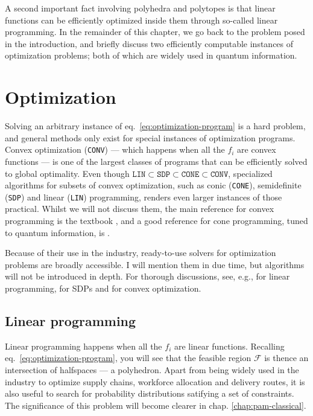 		A second important fact involving polyhedra and polytopes is that linear functions can be efficiently optimized inside them through so-called linear programming. In the remainder of this chapter, we go back to the problem posed in the introduction, and briefly discuss two efficiently computable instances of optimization problems; both of which are widely used in quantum information.


	\section{Optimization}

		Solving an arbitrary instance of eq.~\eqref{eq:optimization-program} is a hard problem, and general methods only exist for special instances of optimization programs. Convex optimization (\texttt{CONV}) --- which happens when all the $f_i$ are convex functions --- is one of the largest classes of programs that can be efficiently solved to global optimality. Even though $\texttt{LIN} \subset \texttt{SDP} \subset \texttt{CONE} \subset \texttt{CONV}$, specialized algorithms for subsets of convex optimization, such as conic (\texttt{CONE}), semidefinite (\texttt{SDP}) and linear (\texttt{LIN}) programming, renders even larger instances of those practical. Whilst we will not discuss them, the main reference for convex programming is the textbook \cite{boyd_convexoptimization_2004}, and a good reference for cone programming, tuned to quantum information, is \cite{uola_conic_2019}.

		Because of their use in the industry, ready-to-use solvers for optimization problems are broadly accessible. I will mention them in due time, but algorithms will not be introduced in depth. For thorough discussions, see, e.g., \cite{papadimitriou1998combinatorial,matousek2007understanding} for linear programming, \cite{vandenberghe_sdp_1996,gartner2012approximation} for SDPs and \cite{boyd_convexoptimization_2004} for convex optimization.


		\subsection{Linear programming}
		\label{sec:linear-programming}

			Linear programming happens when all the $f_i$ are linear functions. Recalling eq.~\eqref{eq:optimization-program}, you will see that the feasible region $\mathcal{F}$ is thence an intersection of halfspaces --- a polyhedron. Apart from being widely used in the industry to optimize supply chains, workforce allocation and delivery routes, it is also useful to search for probability distributions satifying a set of constraints. The significance of this problem will become clearer in chap. \ref{chap:pam-classical}.

